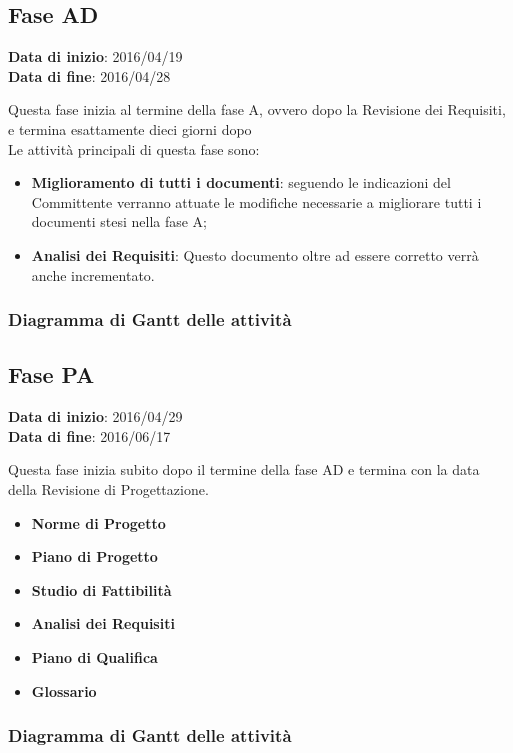 	\subsection{Fase AD}
	\begin{center}
		\textbf{Data di inizio}: 2016/04/19 \\
		\textbf{Data di fine}: 2016/04/28 \\
	\end{center}
	Questa fase inizia al termine della fase A, ovvero dopo la Revisione dei Requisiti, e termina esattamente dieci giorni dopo \\ 
	Le attività principali di questa fase sono:
		\begin{itemize}
			\item \textbf{Miglioramento di tutti i documenti}: seguendo le indicazioni del Committente verranno attuate le modifiche necessarie a migliorare tutti i documenti stesi nella fase A;
			\item \textbf{Analisi dei Requisiti}: Questo documento oltre ad essere corretto verrà anche incrementato.
		\end{itemize}
		
		\subsubsection{Diagramma di Gantt delle attività}
		
		
	\subsection{Fase PA}
	\begin{center}
		\textbf{Data di inizio}: 2016/04/29 \\
		\textbf{Data di fine}: 2016/06/17 \\
	\end{center}
	Questa fase inizia subito dopo il termine della fase AD e termina con la data della Revisione di Progettazione. 
		\begin{itemize}
			\item \textbf{Norme di Progetto}
			\item \textbf{Piano di Progetto}
			\item \textbf{Studio di Fattibilità}
			\item \textbf{Analisi dei Requisiti}
			\item \textbf{Piano di Qualifica}
			\item \textbf{Glossario}
		\end{itemize}
		\subsubsection{Diagramma di Gantt delle attività}
		
